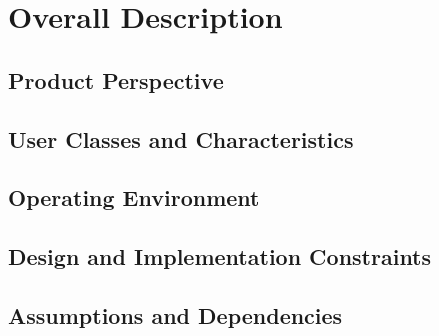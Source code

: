 {
\chapter{Overall Description}
\section{Product Perspective}
\section{User Classes and Characteristics}
\section{Operating Environment}
\section{Design and Implementation Constraints}
\section{Assumptions and Dependencies}
}